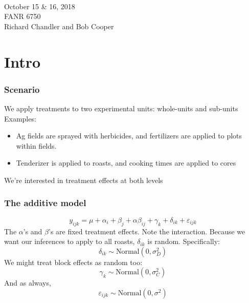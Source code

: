 \documentclass[color=usenames,dvipsnames]{beamer}\usepackage[]{graphicx}\usepackage[]{color}
\begin{document}
\begin{frame}[plain]
  \huge
  \centering \par
  {\color{RoyalBlue}{Lab 9 -- Split-plot Designs}} \\
  \vspace{1cm}
  \Large
  October 15 \& 16, 2018 \\
  FANR 6750 \\
  \vfill
  \large
  Richard Chandler and Bob Cooper
\end{frame}





\section{Intro}





\begin{frame}
  \frametitle{Scenario}
  \large
  We apply treatments to two experimental units: whole-units and
  sub-units
  \pause
  \vfill
  Examples:
  \begin{itemize}
    \large
    \item Ag fields are sprayed with herbicides, and fertilizers
      are applied to plots within fields.
    \item Tenderizer is applied to roasts, and cooking times are
      applied to cores
  \end{itemize}
  \pause
  \vfill
  We're interested in treatment effects at both levels
\end{frame}






\begin{frame}
  \frametitle{The additive model}
\[
y_{ijk} = \mu + \alpha_i + \beta_{j} + \alpha\beta_{ij} + \gamma_k +
\delta_{ik} + \varepsilon_{ijk}
\] %
The $\alpha$'s and $\beta$'s are fixed treatment effects. Note the interaction.
\pause
\vfill
Because we want our inferences to apply to all roasts,
$\delta_{ik}$ is random. Specifically:
\[
\delta_{ik} \sim \mbox{Normal}(0, \sigma^2_D)
\]
We might treat block effects as random too:
\[
\gamma_k \sim \mbox{Normal}(0, \sigma^2_C)
\]
\large
And as always,
\[
\varepsilon_{ijk} \sim \mbox{Normal}(0, \sigma^2)
\]
\end{frame}
\end{document}
